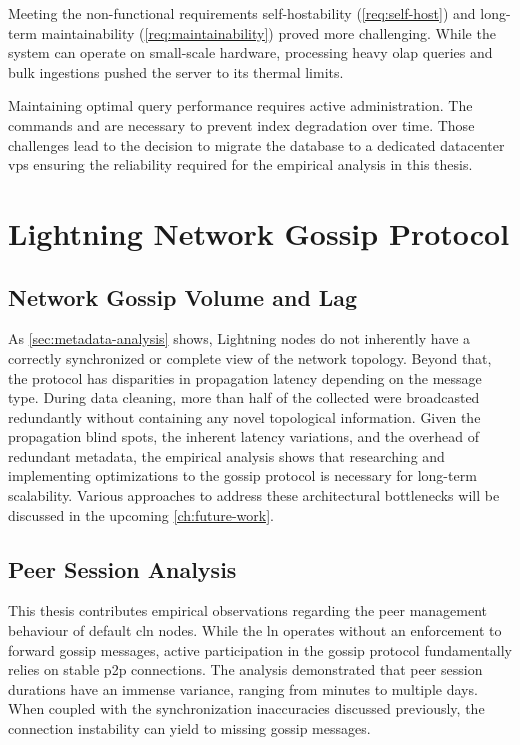 Meeting the non-functional requirements self-hostability (\ref{req:self-host}) and 
long-term maintainability (\ref{req:maintainability}) proved more challenging. 
While the system can operate on small-scale hardware, processing heavy \gls{olap} queries and 
bulk ingestions pushed the server to its thermal limits.

Maintaining optimal query performance requires active administration.
The commands  and  are necessary to prevent index degradation over time. 
Those challenges lead to the decision to migrate the database to a dedicated datacenter \gls{vps} 
ensuring the reliability required for the empirical analysis in this thesis.


\section{Lightning Network Gossip Protocol}
\label{sec:ln-gossip-protocol-conclusion}


\subsection{Network Gossip Volume and Lag}

As \autoref{sec:metadata-analysis} shows, Lightning nodes do not inherently have a 
correctly synchronized or complete view of the network topology. 
Beyond that, the protocol has disparities in propagation latency depending on the message type. 
During data cleaning, more than half of the collected  
were broadcasted redundantly without containing any novel topological information. 
Given the propagation blind spots, the inherent latency variations, and the overhead of redundant metadata, 
the empirical analysis shows that researching and implementing optimizations to the gossip protocol is necessary for long-term scalability. 
Various approaches to address these architectural bottlenecks will be discussed in the upcoming \autoref{ch:future-work}.


\subsection{Peer Session Analysis}

This thesis contributes empirical observations regarding the peer management behaviour of default \gls{cln} nodes. 
While the \gls{ln} operates without an enforcement to forward gossip messages, 
active participation in the gossip protocol fundamentally relies on stable \gls{p2p} connections. 
The analysis demonstrated that peer session durations have an immense variance, ranging from minutes to multiple days. 
When coupled with the synchronization inaccuracies discussed previously, 
the connection instability can yield to missing gossip messages.

